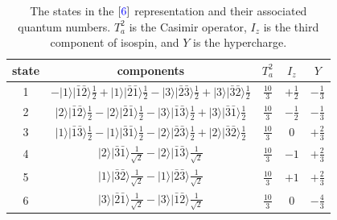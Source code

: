 \documentclass[11pt]{article}
\begin{document}
\begin{table}
\center
\caption{The states in the $[{\color{blue}6}]$ representation and their associated quantum numbers.  $T^2_a$ is the Casimir operator, $I_z$ is the third component of isospin, and $Y$ is the hypercharge.\label{tab:6}}
\begin{tabular}{c|c|c|c|c}
state&components& $T_a^2$ & $I_z$ & $Y$\\
\hline\hline
1& $-|1\rangle|\bar{1}\bar{2}\rangle\frac{1}{2}+|1\rangle|\bar{2}\bar{1}\rangle\frac{1}{2}-|3\rangle|\bar{2}\bar{3}\rangle\frac{1}{2}+|3\rangle|\bar{3}\bar{2}\rangle\frac{1}{2}$ &$\frac{10}{3}$ &$+\frac{1}{2}$ & $-\frac{1}{3}$\\
2& $|2\rangle|\bar{1}\bar{2}\rangle\frac{1}{2}-|2\rangle|\bar{2}\bar{1}\rangle\frac{1}{2}-|3\rangle|\bar{1}\bar{3}\rangle\frac{1}{2}+|3\rangle|\bar{3}\bar{1}\rangle\frac{1}{2}$ &$\frac{10}{3}$ &$-\frac{1}{2}$ & $-\frac{1}{3}$\\
\hline
3& $|1\rangle|\bar{1}\bar{3}\rangle\frac{1}{2}-|1\rangle|\bar{3}\bar{1}\rangle\frac{1}{2}-|2\rangle|\bar{2}\bar{3}\rangle\frac{1}{2}+|2\rangle|\bar{3}\bar{2}\rangle\frac{1}{2}$ &$\frac{10}{3}$ &0 & $+\frac{2}{3}$\\
4& $|2\rangle|\bar{3}\bar{1}\rangle\frac{1}{\sqrt{2}}-|2\rangle|\bar{1}\bar{3}\rangle\frac{1}{\sqrt{2}}$ &$\frac{10}{3}$ &$-1$ & $+\frac{2}{3}$\\
5& $|1\rangle|\bar{3}\bar{2}\rangle\frac{1}{\sqrt{2}}-|1\rangle|\bar{2}\bar{3}\rangle\frac{1}{\sqrt{2}}$ &$\frac{10}{3}$ &$+1$ & $+\frac{2}{3}$\\
\hline
6& $|3\rangle|\bar{2}\bar{1}\rangle\frac{1}{\sqrt{2}}-|3\rangle|\bar{1}\bar{2}\rangle\frac{1}{\sqrt{2}}$ &$\frac{10}{3}$ &0 & $-\frac{4}{3}$\\
\hline\hline
\end{tabular}
\end{table}
\end{document}
